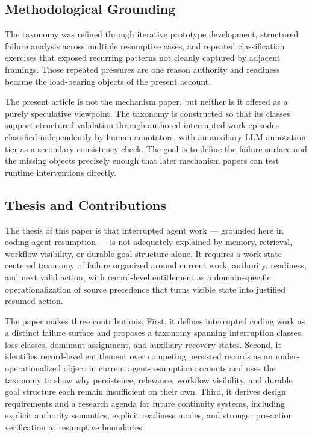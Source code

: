 \documentclass[preprint,12pt]{elsarticle}
\begin{document}
\subsection{Methodological Grounding}

The taxonomy was refined through iterative prototype development, structured failure analysis across multiple resumptive cases, and repeated classification exercises that exposed recurring patterns not cleanly captured by adjacent framings. Those repeated pressures are one reason authority and readiness became the load-bearing objects of the present account.

The present article is not the mechanism paper, but neither is it offered as a purely speculative viewpoint. The taxonomy is constructed so that its classes support structured validation through authored interrupted-work episodes classified independently by human annotators, with an auxiliary LLM annotation tier as a secondary consistency check. The goal is to define the failure surface and the missing objects precisely enough that later mechanism papers can test runtime interventions directly.

\subsection{Thesis and Contributions}

The thesis of this paper is that interrupted agent work --- grounded here in coding-agent resumption --- is not adequately explained by memory, retrieval, workflow visibility, or durable goal structure alone. It requires a work-state-centered taxonomy of failure organized around current work, authority, readiness, and next valid action, with record-level entitlement as a domain-specific operationalization of source precedence that turns visible state into justified resumed action.

The paper makes three contributions. First, it defines interrupted coding work as a distinct failure surface and proposes a taxonomy spanning interruption classes, loss classes, dominant assignment, and auxiliary recovery states. Second, it identifies record-level entitlement over competing persisted records as an under-operationalized object in current agent-resumption accounts and uses the taxonomy to show why persistence, relevance, workflow visibility, and durable goal structure each remain insufficient on their own. Third, it derives design requirements and a research agenda for future continuity systems, including explicit authority semantics, explicit readiness modes, and stronger pre-action verification at resumptive boundaries.
\end{document}

